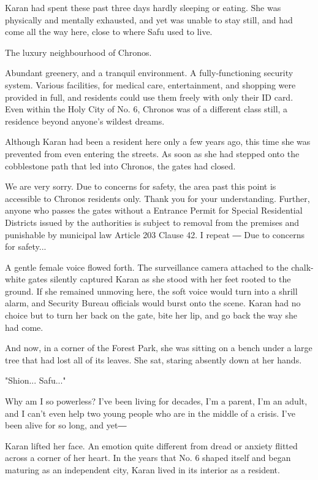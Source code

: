 Karan had spent these past three days hardly sleeping or eating. She was
physically and mentally exhausted, and yet was unable to stay still, and
had come all the way here, close to where Safu used to live.

The luxury neighbourhood of Chronos.

Abundant greenery, and a tranquil environment. A fully-functioning
security system. Various facilities, for medical care, entertainment,
and shopping were provided in full, and residents could use them freely
with only their ID card. Even within the Holy City of No. 6, Chronos was
of a different class still, a residence beyond anyone's wildest dreams.

Although Karan had been a resident here only a few years ago, this time
she was prevented from even entering the streets. As soon as she had
stepped onto the cobblestone path that led into Chronos, the gates had
closed.

We are very sorry. Due to concerns for safety, the area past this point
is accessible to Chronos residents only. Thank you for your
understanding. Further, anyone who passes the gates without a Entrance
Permit for Special Residential Districts issued by the authorities is
subject to removal from the premises and punishable by municipal law
Article 203 Clause 42. I repeat ― Due to concerns for safety...

A gentle female voice flowed forth. The surveillance camera attached to
the chalk-white gates silently captured Karan as she stood with her feet
rooted to the ground. If she remained unmoving here, the soft voice
would turn into a shrill alarm, and Security Bureau officials would
burst onto the scene. Karan had no choice but to turn her back on the
gate, bite her lip, and go back the way she had come.

And now, in a corner of the Forest Park, she was sitting on a bench
under a large tree that had lost all of its leaves. She sat, staring
absently down at her hands.

"Shion... Safu..."

Why am I so powerless? I've been living for decades, I'm a parent, I'm
an adult, and I can't even help two young people who are in the middle
of a crisis. I've been alive for so long, and yet―

Karan lifted her face. An emotion quite different from dread or anxiety
flitted across a corner of her heart. In the years that No. 6 shaped
itself and began maturing as an independent city, Karan lived in its
interior as a resident.


